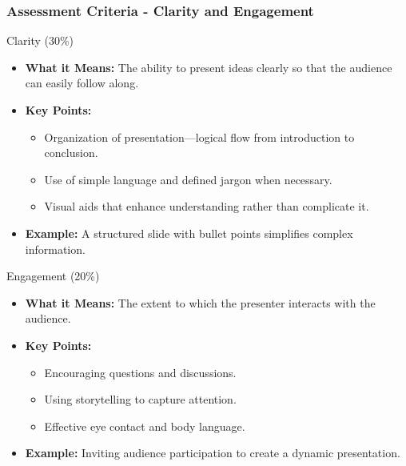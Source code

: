 \documentclass[aspectratio=169]{beamer}
\begin{document}
\begin{frame}[fragile]
    \frametitle{Assessment Criteria - Clarity and Engagement}
    \begin{block}{Clarity (30\%)}
        \begin{itemize}
            \item \textbf{What it Means:} The ability to present ideas clearly so that the audience can easily follow along.
            \item \textbf{Key Points:}
            \begin{itemize}
                \item Organization of presentation—logical flow from introduction to conclusion.
                \item Use of simple language and defined jargon when necessary.
                \item Visual aids that enhance understanding rather than complicate it.
            \end{itemize}
            \item \textbf{Example:} A structured slide with bullet points simplifies complex information.
        \end{itemize}
    \end{block}

    \begin{block}{Engagement (20\%)}
        \begin{itemize}
            \item \textbf{What it Means:} The extent to which the presenter interacts with the audience.
            \item \textbf{Key Points:}
            \begin{itemize}
                \item Encouraging questions and discussions.
                \item Using storytelling to capture attention.
                \item Effective eye contact and body language.
            \end{itemize}
            \item \textbf{Example:} Inviting audience participation to create a dynamic presentation.
        \end{itemize}
    \end{block}
\end{frame}
\end{document}
